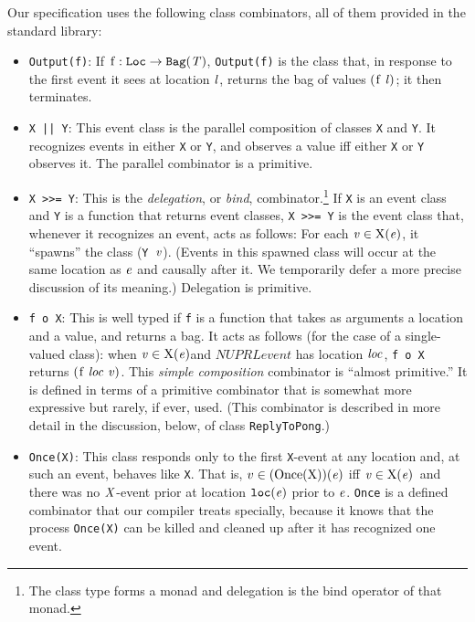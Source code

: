 \documentclass[final]{article}
\newcommand{\dgclassrel}[3]{\NUPRLclassrel{}{#1}{}{#2}{#3}}
\newcommand{\vXe}%
 {\ensuremath{\dgclassrel{\NUPRLevent}{\text{\lstinline{X}}}{\NUPRL{v}}}}
\newcommand{\listinline}[1]{\text{\lstinline{#1}}}
\begin{document}
Our specification uses the following class combinators, all of them
provided in the standard library:
\begin{itemize}
\item
\lstinline{Output(f)}:%
%
%
If $\listinline{f}:\NUPRLarrow{\NUPRLloc}{\NUPRLbag{\NUPRL{T}}}$,
\lstinline{Output(f)} is the class that, in response to the
first event it sees at location
$\mathit{l}$, returns the bag of values $(\listinline{f}~\NUPRL{l})$;
it then terminates.

\item
\lstinline{X || Y}:%
%
%
%
This event class is the parallel composition of classes \lstinline{X}
and \lstinline{Y}.  It recognizes events in either \lstinline{X} or
\lstinline{Y}, and observes a value iff either \lstinline{X} or
\lstinline{Y} observes it.  The parallel combinator is a primitive.

\item
\lstinline{X >>= Y}:%
%
%
%
%
This is the \emph{delegation}, or \emph{bind},
combinator.\footnote{The class type forms a monad and delegation is
  the bind operator of that monad.}  If
\lstinline{X} is an
event class and \lstinline{Y} is a function that returns event classes,
%
\lstinline{X >>= Y}
%
is the event class that, whenever it recognizes an event, acts as
follows: For each \vXe, it ``spawns'' the class
(\lstinline{Y}~$\mathit{v}$).  (Events in this spawned class will occur
at the same location as $\mathit{e}$ and causally after it.  We
temporarily defer a more precise discussion of its meaning.)
Delegation is primitive.

\item
\lstinline{f o X}:%
%
%
%
This is well typed if \lstinline{f} is a function that takes as
arguments a location and a value, and returns a bag.  It acts as
follows (for the case of a single-valued class): when \vXe and
$NUPRLevent$ has location $\mathit{loc}$, \lstinline{f o X} returns
$(\listinline{f}~\NUPRL{loc}~\NUPRL{v})$.  This \emph{simple
  composition} combinator is ``almost primitive.''  It is defined in
terms of a primitive combinator that is somewhat more expressive but
rarely, if ever, used.  (This combinator is described in more detail
in the discussion, below, of class \lstinline{ReplyToPong}.)

\item
\lstinline{Once(X)}:%
%
%
This class responds only to the first \lstinline{X}-event at any
location and, at such an event, behaves like \lstinline{X}.  That is,
$\dgclassrel{\NUPRLevent}{(\text{\lstinline{Once(X)}})}{v}$ iff
\vXe\ and there was no $\mathit{X}$-event prior at location
$\mathtt{loc}(\mathit{e})$ prior to $\mathit{e}$.  \lstinline{Once}
is a defined combinator that our compiler treats specially, because it
knows that the process \lstinline{Once(X)} can be killed and cleaned
up after it has recognized one event.


\end{itemize}
\end{document}
